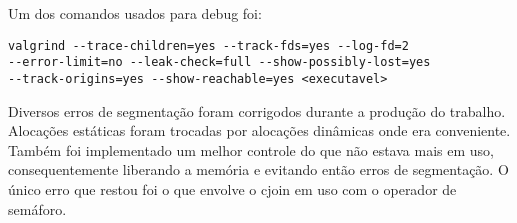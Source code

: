 \documentclass{article}
\begin{document}
Um dos comandos usados para debug foi:
\begin{verbatim}
valgrind --trace-children=yes --track-fds=yes --log-fd=2
--error-limit=no --leak-check=full --show-possibly-lost=yes
--track-origins=yes --show-reachable=yes <executavel>
\end{verbatim}

Diversos erros de segmentação foram corrigodos durante a produção do trabalho. Alocações estáticas foram trocadas por alocações dinâmicas onde era conveniente. Também foi implementado um melhor controle do que não estava mais em uso, consequentemente liberando a memória e evitando então erros de segmentação. O único erro que restou foi o que envolve o cjoin em uso com o operador de semáforo.
\end{document}

